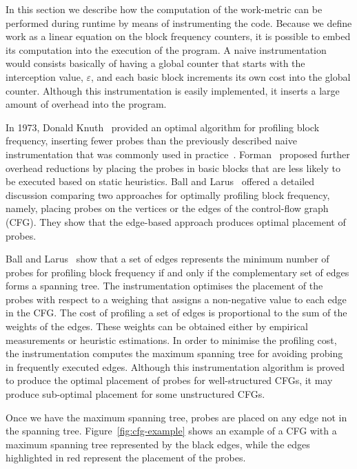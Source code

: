 \documentclass[sigplan,9pt]{acmart}
\begin{document}
In this section we describe how the computation of the work-metric can be
performed during runtime by means of instrumenting the code.
Because we define work as a linear equation on the block frequency counters,
it is possible to embed its computation into the execution of the program.
A naive instrumentation would consists basically of having a global counter
that starts with the interception value, $\varepsilon$, and each basic block
increments its own cost into the global counter. Although this instrumentation
is easily implemented, it inserts a large amount of overhead into the program.

In 1973, Donald Knuth~\cite{knuth73} provided an optimal algorithm for
profiling block frequency, inserting fewer probes than the previously described
naive instrumentation that was commonly used in practice~\cite{knuth71}.
Forman~\cite{forman81} proposed further overhead reductions by placing the
probes in basic blocks that are less likely to be executed based on static
heuristics.
Ball and Larus~\cite{ball94} offered a detailed discussion comparing
two approaches for optimally profiling block frequency, namely,
placing probes on the vertices or the edges of the control-flow graph (CFG).
They show that the edge-based approach produces optimal placement of probes.

Ball and Larus~\cite{ball94} show that a set of edges represents the minimum
number of probes for profiling block frequency if and only if the complementary
set of edges forms a spanning tree.
The instrumentation optimises the placement of the probes with respect to a
weighing that assigns a non-negative value to each edge in the CFG.
The cost of profiling a set of edges is proportional to the sum of the weights
of the edges.
These weights can be obtained either by empirical measurements or heuristic
estimations.
In order to minimise the profiling cost, the instrumentation computes the
maximum spanning tree for avoiding probing in frequently executed edges.
Although this instrumentation algorithm is proved to produce the optimal
placement of probes for well-structured CFGs, it may produce sub-optimal
placement for some unstructured CFGs.

Once we have the maximum spanning tree, probes are placed on any edge not in 
the spanning tree. Figure~\ref{fig:cfg-example} shows an example of a CFG
with a maximum spanning tree represented by the black edges, while the edges 
highlighted in red represent the placement of the probes.
\end{document}
